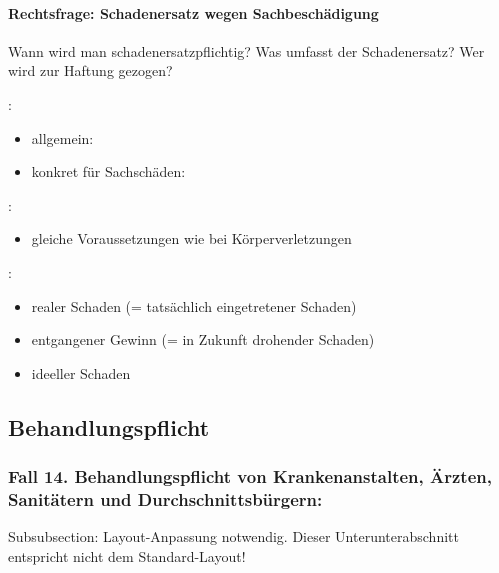 \paragraph{Rechtsfrage: Schadenersatz wegen Sachbeschädigung}

Wann wird man schadenersatzpflichtig? Was umfasst der Schadenersatz? Wer
wird zur Haftung gezogen?


:

\begin{itemize}
    \item {\mdseries
    allgemein: }
    
    \item {\mdseries
    konkret f\"ur Sachschäden: }
    
\end{itemize}

:

\begin{itemize}
    \item[] {\mdseries
    gleiche Voraussetzungen wie bei K\"orperverletzungen}
\end{itemize}

:

\begin{itemize}
    \item realer Schaden (= tatsächlich eingetretener Schaden)
    \item entgangener Gewinn (= in Zukunft drohender Schaden)
    \item ideeller Schaden
\end{itemize}




\subsection{Behandlungspflicht}

\subsubsection{Fall 14. Behandlungspflicht von Krankenanstalten, \"Arzten,
Sanitätern und Durchschnittsb\"urgern:}
\begin{anfxwarning}[author=GABS]{Subsubsection: Layout-Anpassung notwendig.}
Dieser Unterunterabschnitt entspricht nicht dem Standard-Layout!
\end{anfxwarning}

